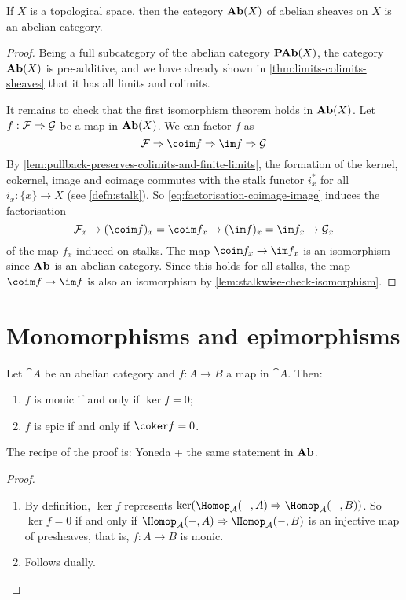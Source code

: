 \begin{prop}
If \(X\) is a topological space, then the category \(\operatorname{\mathbf{Ab}}(X)\) of abelian sheaves on \(X\) is an abelian category.
\end{prop}
\begin{proof}
Being a full subcategory of the abelian category \(\operatorname{\mathbf{PAb}}(X)\), the category \(\operatorname{\mathbf{Ab}}(X)\) is pre-additive, and we have already shown in \cref{thm:limits-colimits-sheaves} that it has all limits and colimits.

It remains to check that the first isomorphism theorem holds in \(\operatorname{\mathbf{Ab}}(X)\).
Let \(f\colon\mathcal F\To\mathcal G\) be a map in \(\operatorname{\mathbf{Ab}}(X)\).
We can factor \(f\) as
\begin{equation}\label{eq:factorisation-coimage-image}
  \mathcal F \To \coim f \To \im f \To \mathcal G
\end{equation}
By \cref{lem:pullback-preserves-colimits-and-finite-limits}, the formation of the kernel, cokernel, image and coimage commutes with the stalk functor \(i_x^*\) for all \(i_x\colon\{x\}\to X\) (see \cref{defn:stalk}).
So \cref{eq:factorisation-coimage-image} induces the factorisation
\[ \mathcal F_x \to (\coim f)_x = \coim f_x \to (\im f)_x = \im f_x \to \mathcal G_x \]
of the map \(f_x\) induced on stalks.
The map \(\coim f_x\to\im f_x\) is an isomorphism since \(\mathbf{Ab}\) is an abelian category.
Since this holds for all stalks, the map \(\coim f\to\im f\) is also an isomorphism by \cref{lem:stalkwise-check-isomorphism}.
\end{proof}

\section{Monomorphisms and epimorphisms}

\begin{lem}
Let \(\cat A\) be an abelian category and \(f\colon A\to B\) a map in \(\cat A\).
Then:
\begin{enumerate}
\item \(f\) is monic if and only if \(\ker f = 0\);
\item \(f\) is epic if and only if \(\coker f = 0\).
\end{enumerate}
\end{lem}

The recipe of the proof is: Yoneda + the same statement in \(\mathbf{Ab}\).

\begin{proof}
\begin{enumerate}
\item
  By definition, \(\ker f\) represents \(\ker(\Hom[\cat A](-,A)\To\Hom[\cat A](-,B))\).
  So \(\ker f = 0\) if and only if \(\Hom[\cat A](-,A)\To\Hom[\cat A](-,B)\) is an injective map of presheaves, that is, \(f\colon A\to B\) is monic.
\item Follows dually. \qedhere
\end{enumerate}
\end{proof}

